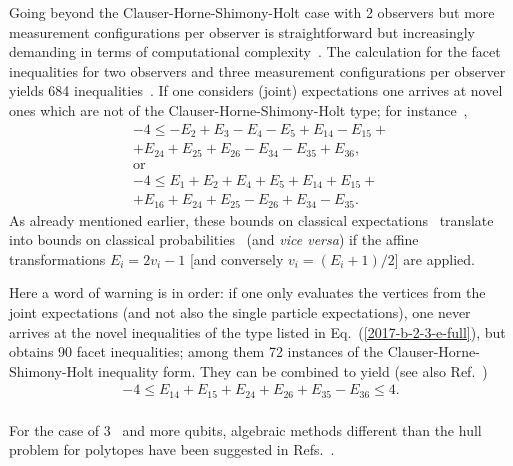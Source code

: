 Going beyond the Clauser-Horne-Shimony-Holt case with 2 observers but more measurement configurations per observer is straightforward
but increasingly demanding in terms of computational complexity~\cite{Pit-91}.
The calculation for the facet inequalities for two observers and three measurement configurations per observer
yields  684 inequalities~\cite{2000-poly,sliwa-2003,collins-gisin-2003}.
If one considers (joint) expectations one arrives at novel ones
which are not of the Clauser-Horne-Shimony-Holt type; for instance~\cite[p.~166, Eq.~(4)]{sliwa-2003},
\begin{equation}
\begin{split}
-4   \le    -E_2  +E_3 -E_4  -E_5  +E_{14} -E_{15} +    \\+E_{24}  +E_{25}  +E_{26} -E_{34} -E_{35}  +E_{36},     \\
\text{or}\\
-4 \le   E_1  +E_2   +E_4  +E_5    +E_{14}  +E_{15} + \\+E_{16}  +E_{24}  +E_{25} -E_{26}  +E_{34} -E_{35}.
\end{split}
\label{2017-b-2-3-e-full}
\end{equation}
As already mentioned earlier, these bounds on classical expectations~\cite{sliwa-2003}
translate into bounds on classical probabilities~\cite{2000-poly,collins-gisin-2003} (and {\em vice versa})
if the affine transformations
$E_i = 2 v_i - 1$ [and conversely $v_i = (E_i +1)/2$] are applied.


Here a word of warning is in order: if one only evaluates the vertices from the joint expectations (and not also the single particle expectations),
one never arrives at the novel inequalities of the type listed in Eq.~(\ref{2017-b-2-3-e-full}),
but obtains
90 facet inequalities; among them 72
instances  of the Clauser-Horne-Shimony-Holt inequality form.
They can be combined to yield  (see also Ref.~\cite[p.~166, Eq.~(4)]{sliwa-2003})
\begin{equation}
\begin{split}
-4 \le   E_{14} + E_{15}    + E_{24}   + E_{26}    + E_{35}  - E_{36}  \le   4.            \\
\end{split}
\label{2017-b-2-3-enovel}
\end{equation}


For the case of $3$~\cite{2000-poly} and more qubits, algebraic methods
different than the hull problem for polytopes have been suggested in Refs.~\cite{Werner-2001,Zukowski-02,Pitowsky-2002mbo,schachner-2003}.





